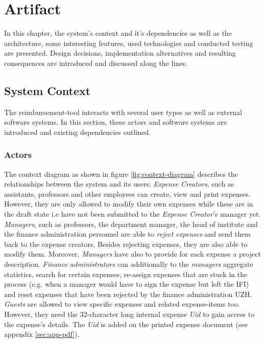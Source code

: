 \chapter{Artifact}

In this chapter, the system's context and it's dependencies as well as the architecture, some interesting features, used technologies and conducted testing are presented. Design decisions, implementation alternatives and resulting consequences are introduced and discussed along the lines.

\section{System Context}

The reimbursement-tool interacts with several user types as well as external software systems. In this section, these actors and software systems are introduced and existing dependencies outlined.

\subsection{Actors}

The context diagram as shown in figure \ref{fig:context-diagram} describes the relationships between the system and its users:
\textit{Expense Creators}, such as assistants, professors and other employees can create, view and print expenses. However, they are only allowed to modify their own expenses while these are in the draft state i.e have not been submitted to the \textit{Expense Creator}'s manager yet.  \textit{Managers}, such as professors, the department manager, the head of institute and the finance administration personnel are able to \textit{reject expenses} and send them back to the expense creators. Besides rejecting expenses, they are also able to modify them. Moreover, \textit{Managers} have also to provide for each expense a project description. \textit{Finance administrators} can additionally to the \textit{managers} aggregate statistics, search for certain expenses, re-assign expenses that are stuck in the process (e.g. when a manager would have to sign the expense but left the IFI) and reset expenses that have been rejected by the finance administration UZH. \textit{Guests} are allowed to view specific expenses and related expense-items too. However, they need the 32-character long internal expense \textit{Uid} to gain access to the expense's details. The \textit{Uid} is added on the printed expense document (see appendix \ref{sec:app-pdf}).


